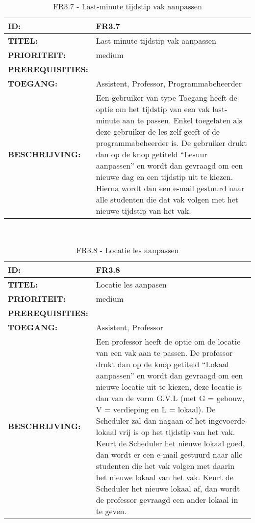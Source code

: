 \noindent\begin{table}[H]
            \begin{tabular}{l | p{10cm}}
                \textbf{ID:} & FR3.7 \\ \hline
                \textbf{TITEL:} & Last-minute tijdstip vak aanpassen\\ \hline
                \textbf{PRIORITEIT:} &  medium \\ \hline
                \textbf{PREREQUISITIES:} & \\ \hline
                \textbf{TOEGANG:} & Assistent, Professor, Programmabeheerder \\ \hline
                \textbf{BESCHRIJVING:} & Een gebruiker van type Toegang heeft de optie om het tijdstip van een vak last-minute aan te passen. Enkel toegelaten als deze gebruiker de les zelf geeft of de programmabeheerder is.  De gebruiker drukt dan op de knop getiteld “Lesuur aanpassen” en wordt dan gevraagd om een nieuwe dag en een tijdstip uit te kiezen. 
                                        Hierna wordt dan een e-mail gestuurd naar alle studenten die dat vak volgen met het nieuwe tijdstip van het vak.\\ 
            \end{tabular}\\
            \caption{FR3.7 - Last-minute tijdstip vak aanpassen}
            \label{tab:FR3.7 - Last-minute tijdstip vak aanpassen}
        \end{table}
        
\noindent\begin{table}[H]
            \begin{tabular}{l | p{10cm}}
                \textbf{ID:} & FR3.8 \\ \hline
                \textbf{TITEL:} & Locatie les aanpasen\\ \hline
                \textbf{PRIORITEIT:} &  medium \\ \hline
                \textbf{PREREQUISITIES:} & \\ \hline
                \textbf{TOEGANG:} & Assistent, Professor \\ \hline
                \textbf{BESCHRIJVING:} & Een professor heeft de optie om de locatie van een vak aan te passen. 
                                        De professor drukt dan op de knop getiteld “Lokaal aanpassen” en wordt dan gevraagd om een nieuwe locatie uit te kiezen, deze locatie is dan van de vorm G.V.L (met G = gebouw, V = verdieping en L = lokaal). De Scheduler zal dan nagaan of het ingevoerde lokaal vrij is op het tijdstip van het vak. Keurt de Scheduler het nieuwe lokaal goed, dan wordt er een e-mail gestuurd naar alle studenten die het vak volgen met daarin het nieuwe lokaal van het vak. Keurt de Scheduler het nieuwe lokaal af, dan wordt de professor gevraagd een ander lokaal in te geven.\\ 
            \end{tabular}\\
            \caption{FR3.8 - Locatie les aanpassen}
            \label{tab:FR3.8 - Locatie les aanpassen}
        \end{table}
        
